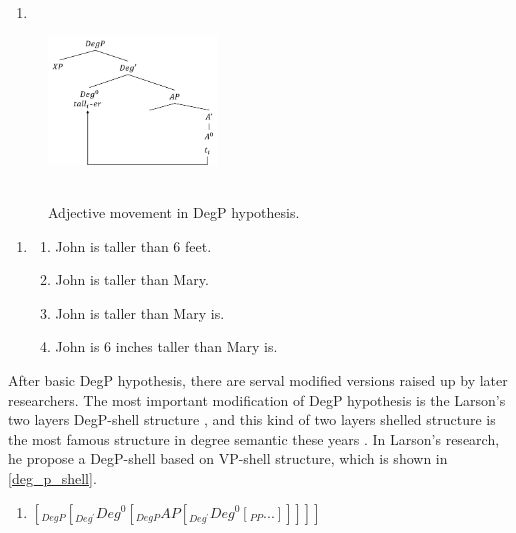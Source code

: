 \documentclass{ctexart}
\let \cite \parencite
\begin{document}
\begin{enumerate}
    \item \label{degp_hypothesis}
\end{enumerate}

\begin{figure}[H]
    \centering
    \includegraphics[width=0.4\textwidth]{pic/degP_hy.png}
    \begin{caption}
        \\ \vspace{-1.1ex}
        Adjective movement in DegP hypothesis.
    \end{caption}
\end{figure}

\begin{enumerate}
    \item \label{er_var_example}
    \begin{enumerate}
        \item \label{er_var_1} John is taller than 6 feet.
        \item \label{er_var_2} John is taller than Mary.
        \item \label{er_var_3} John is taller than Mary is.
        \item \label{er_var_4} John is 6 inches taller than Mary is.
    \end{enumerate}

\end{enumerate}

After basic DegP hypothesis, there are serval modified versions raised up by later researchers. The most important modification of DegP hypothesis is the Larson's two layers DegP-shell structure \cite{larson1991}, and this kind of two layers shelled structure is the most famous structure in degree semantic these years \cite{grano2012,guo2012,xiang2005,fabregas2020}. In Larson's research, he propose a DegP-shell based on VP-shell structure, which is shown in \ref{deg_p_shell}. 

\begin{enumerate}
    \item \label{deg_p_shell} $[_{DegP} [_{Deg^{\prime}} Deg^0 [_{DegP} AP [_{Deg^{\prime}} Deg^0 [_{PP}...]]]]] $
\end{enumerate}
\end{document}
